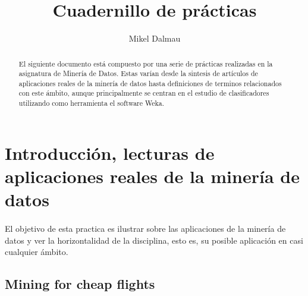 \documentclass[es]{ifirak}
\begin{document}
\title{Cuadernillo de prácticas}
\author{Mikel Dalmau}

\maketitle

\begin{abstract}
El siguiente documento está compuesto por una serie de prácticas realizadas en la asignatura de Minería de Datos. Estas varían desde la sintesis de artículos de aplicaciones reales de la minería de datos hasta definiciones de terminos relacionados con este ámbito, aunque principalmente se centran en el estudio de clasificadores utilizando como herramienta el software Weka.
\end{abstract}

\section{Introducción, lecturas de aplicaciones reales de la minería de datos }
\paragraph{}
 El objetivo de esta practica es ilustrar sobre las aplicaciones de la minería de datos y ver la horizontalidad de la disciplina, esto es, su posible aplicación en casi cualquier ámbito.
\subsection{Mining for cheap flights}
\end{document}
